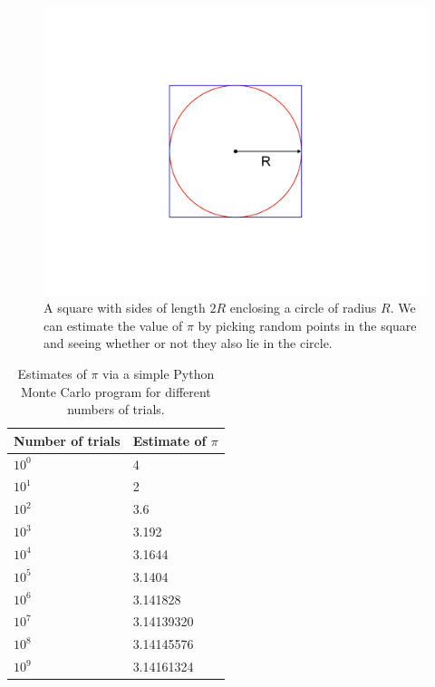 \begin{figure}[t]
\centering
\includegraphics[scale=0.5]{Images/monte_carlo.pdf} 
\caption{A square with sides of length $2R$ enclosing a circle of radius $R$. We can estimate the value of $\pi$ by picking random points in the square and seeing whether or not they also lie in the circle.}
\label{fig:estpi}
\end{figure}

\begin{table}[t]
  \centering
  \begin{tabular}{ | m{5cm} | m{5cm} | }
    \hline
    \centering Number of trials & Estimate of $\pi$ \\ \hline
    \centering $10^0$
    & 
    4
    \\ 
    \centering $10^1$
    & 
     2
    \\ 
    \centering $10^2$
    & 
    3.6
    \\ 
    \centering $10^3$
    & 
    3.192
    \\
    \centering $10^4$
    & 
    3.1644
    \\
    \centering $10^5$
    & 
    3.1404
    \\
    \centering $10^6$
    & 
    3.141828
    \\
    \centering $10^7$
    & 
    3.14139320
    \\
    \centering $10^8$
    & 
    3.14145576
    \\
    \centering $10^9$
    & 
    3.14161324
    \\                   
    \hline
  \end{tabular}
  
  \caption{Estimates of $\pi$ via a simple Python Monte Carlo program for different numbers of trials.}
  \label{tab:estpi}
\end{table}

